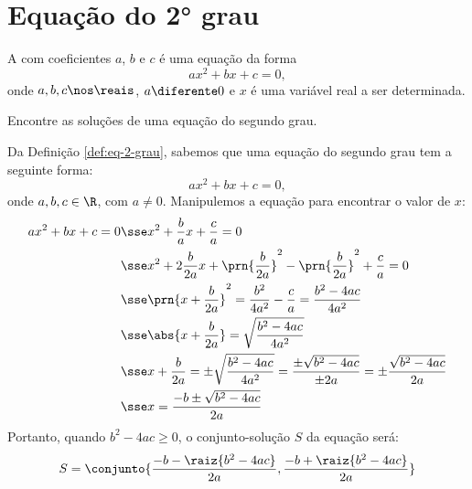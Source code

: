 \section{Equação do 2° grau}

\begin{definition}
    \label{def:eq-2-grau}
    A  com coeficientes $a$, $b$ e $c$ é uma equação da forma 
    \[
        ax^2 + bx + c = 0,
    \]
    onde $a, b, c \nos \reais$, $a \diferente 0$ e $x$ é uma variável real a ser determinada.
\end{definition}

\begin{example}
    \label{ex:sol-2-grau}
    Encontre as soluções de uma equação do segundo grau.
\end{example}

\begin{solution}
    Da Definição \ref{def:eq-2-grau}, sabemos que uma equação do segundo grau tem a seguinte forma:
    \[
        ax^2 + bx + c = 0,
    \]
    onde $a,b,c \in \R$, com $a \ne 0$. Manipulemos a equação para encontrar o valor de $x$:
    \begin{align*}
        ax^2 + bx + c = 0 & \sse x^2+\frac{b}{a}x +\frac{c}{a}=0 \\ 
                          & \sse x^2+2\frac{b}{2a}x+\prn{\frac{b}{2a}}^2-\prn{\frac{b}{2a}}^2+\frac{c}{a}=0\\ 
                          & \sse \prn{x+\frac{b}{2a}}^2=\frac{b^2}{4a^2}-\frac{c}{a}=\frac{b^2 -4ac}{4a^2}\\ 
                          & \sse \abs{x+\frac{b}{2a}} = \sqrt{\frac{b^2-4ac}{4a^2}}\\ 
                          & \sse x+\frac{b}{2a}=\pm\sqrt{\frac{b^2-4ac}{4a^2}}=\frac{\pm\sqrt{b^2-4ac}}{\pm2a}=\pm\frac{\sqrt{b^2-4ac}}{2a}\\ 
                          & \sse x=\frac{-b\pm\sqrt{b^2-4ac}}{2a}\\ 
    \end{align*}
    Portanto, quando $b^2-4ac \ge 0$, o conjunto-solução $S$ da equação será:
    \begin{align*}
        S = \conjunto{\dfrac {-b - \raiz{b^2 - 4ac}} {2a}, \dfrac{-b + \raiz{b^2 - 4ac}} {2a}}
    \end{align*}
\end{solution}

\begin{onlineact}
\end{onlineact}

